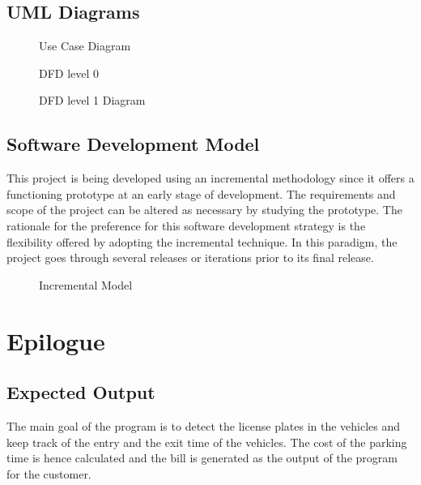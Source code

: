 \newpage
\section{\ac{UML} Diagrams}
\begin{figure}[h!]
    \caption{Use Case Diagram }
    \label{fig:my_label}
\end{figure}
\begin{figure}[h]
    \caption{DFD level 0}
    \label{fig:my_label}
\end{figure}
\begin{figure}[tbh]
    \centering
    \caption{DFD level 1 Diagram}
    \label{fig:my_label}
\end{figure}
\clearpage
\section{Software Development Model}
This project is being developed using an incremental methodology since it offers a functioning prototype at an early stage of development. The requirements and scope of the project can be altered as necessary by studying the prototype. The rationale for the preference for this software development strategy is the flexibility offered by adopting the incremental technique. In this paradigm, the project goes through several releases or iterations prior to its final release.
\begin{figure}[h]
    \centering
    \caption{Incremental Model}
    \label{fig:my_label}
\end{figure}

\chapter{Epilogue}

\section{Expected Output}
The main goal of the program is to detect the license plates in the vehicles and keep track of the entry and the exit time of the vehicles. The cost of the parking time is hence calculated and the bill is generated as the output of the program for the customer.
